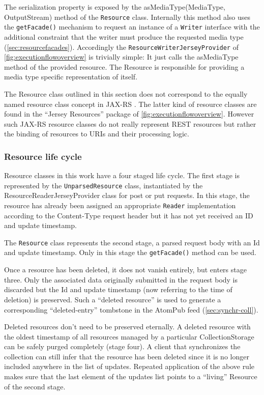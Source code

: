 \documentclass[11pt,a4paper,headsepline,twoside]{scrartcl}		%
\begin{document}
The serialization property is exposed by the asMediaType(MediaType,
OutputStream) method of the \lstinline:Resource: class. Internally this method
also uses the \lstinline:getFacade(): mechanism to request an instance of a
\lstinline:Writer: interface with the additional constraint that the writer must
produce the requested media type (\autoref{sec:resourcefacades}). Accordingly the
\lstinline:ResourceWriterJerseyProvider: of \autoref{fig:executionflowoverview}
is trivially simple: It just calls the asMediaType method of the provided
resource. The Resource is responsible for providing a media type specific
representation of itself.

The Resource class outlined in this section does not correspond to the equally
named resource class concept in JAX-RS \cite{JAX-RS1.1}. The latter kind of
resource classes are found in the ``Jersey Resources'' package of
\autoref{fig:executionflowoverview}. However such JAX-RS resource classes do not
really represent REST resources but rather the binding of resources to URIs and
their processing logic.

\subsubsection{Resource life cycle}
\label{sec:resource-life-cycle}

Resource classes in this work have a four staged life cycle. The first stage is
represented by the \lstinline:UnparsedResource: class, instantiated by the
ResourceReaderJerseyProvider class for post or put requests. In this stage, the
resource has already been assigned an appropriate \lstinline:Reader:
implementation according to the Content-Type request header but it has not yet
received an ID and update timestamp.

The \lstinline:Resource: class represents the second stage, a parsed request
body with an Id and update timestamp. Only in this stage the
\lstinline:getFacade(): method can be used.

Once a resource has been deleted, it does not vanish entirely, but enters stage
three. Only the associated data originally submitted in the request body is
discarded but the Id and update timestamp (now referring to the time of
deletion) is preserved. Such a ``deleted resource'' is used to generate a
corresponding ``deleted-entry'' tombstone in the AtomPub feed
(\autoref{sec:synchr-coll}).

Deleted resources don't need to be preserved eternally. A deleted resource with
the oldest timestamp of all resources managed by a particular CollectionStorage
can be safely purged completely (stage four). A client that synchronizes the
collection can still infer that the resource has been deleted since it is no
longer included anywhere in the list of updates. Repeated application of the
above rule makes sure that the last element of the updates list points to a
``living'' Resource of the second stage.
\end{document}

